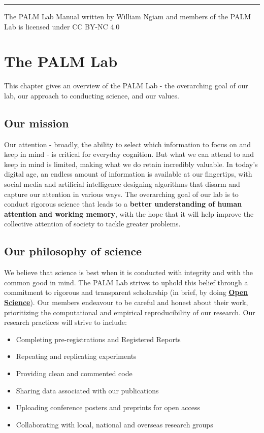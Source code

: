 \documentclass[
]{book}
\providecommand{\tightlist}{%
  \setlength{\itemsep}{0pt}\setlength{\parskip}{0pt}}
\begin{document}
\begin{center}\rule{0.5\linewidth}{0.5pt}\end{center}

The PALM Lab Manual written by William Ngiam and members of the PALM Lab is licensed under CC BY-NC 4.0

\hypertarget{the-lab}{%
\chapter{The PALM Lab}\label{the-lab}}

This chapter gives an overview of the PALM Lab - the overarching goal of our lab, our approach to conducting science, and our values.

\hypertarget{lab-mission}{%
\section{Our mission}\label{lab-mission}}

Our attention - broadly, the ability to select which information to focus on and keep in mind - is critical for everyday cognition. But what we can attend to and keep in mind is limited, making what we do retain incredibly valuable. In today's digital age, an endless amount of information is available at our fingertips, with social media and artificial intelligence designing algorithms that disarm and capture our attention in various ways. The overarching goal of our lab is to conduct rigorous science that leads to a \textbf{better understanding of human attention and working memory}, with the hope that it will help improve the collective attention of society to tackle greater problems.

\hypertarget{lab-philosophy}{%
\section{Our philosophy of science}\label{lab-philosophy}}

We believe that science is best when it is conducted with integrity and with the common good in mind. The PALM Lab strives to uphold this belief through a commitment to rigorous and transparent scholarship (in brief, by doing \protect\hyperlink{open-science}{\textbf{Open Science}}). Our members endeavour to be careful and honest about their work, prioritizing the computational and empirical reproducibility of our research. Our research practices will strive to include:

\begin{itemize}
\tightlist
\item
  Completing pre-registrations and Registered Reports
\item
  Repeating and replicating experiments
\item
  Providing clean and commented code
\item
  Sharing data associated with our publications
\item
  Uploading conference posters and preprints for open access
\item
  Collaborating with local, national and overseas research groups
\end{itemize}
\end{document}
